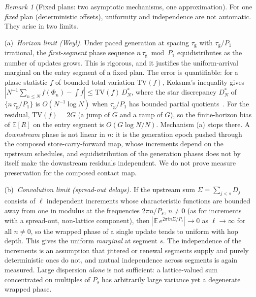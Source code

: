 \documentclass[twocolumn,3p,times,procedia]{elsarticle}
\theoremstyle{plain}
\theoremstyle{remark}
\newtheorem{remark}{Remark}
\newcommand{\E}{\mathbb{E}}
\newcommand{\GEN}{\tau_{\mathrm{g}}}
\begin{document}
\begin{remark}[Fixed plans: two asymptotic mechanisms, one
approximation]\label{rem:fixedmix}
For one \emph{fixed} plan (deterministic offsets), uniformity and
independence are not automatic. They arise in two limits.

(a)~\emph{Horizon limit (Weyl).} Under paced generation at spacing
$\GEN$ with $\GEN/P_1$ irrational, the \emph{first-segment} phase
sequence $n\,\GEN\bmod P_1$ equidistributes as the number of updates
grows. This is rigorous, and it justifies the uniform-arrival marginal
on the entry segment of a fixed plan. The error is quantifiable: for a
phase statistic $f$ of bounded total variation $\mathrm{TV}(f)$,
Koksma's inequality gives
$|N^{-1}\sum_{n\le N}f(\Phi_n)-\int f|\le \mathrm{TV}(f)\,D_N^{*}$, where
the star discrepancy $D_N^{*}$ of $\{n\,\GEN/P_1\}$ is
$O(N^{-1}\log N)$ when $\GEN/P_1$ has bounded partial
quotients~\cite{kuipers1974}. For the residual, $\mathrm{TV}(f)=2G$ (a
jump of $G$ and a ramp of $G$), so the finite-horizon bias of $\E[R]$
on the entry segment is $O(G\log N/N)$. Mechanism (a) stops there. A
\emph{downstream} phase is not linear in $n$: it is the generation
epoch pushed through the composed store-carry-forward map, whose
increments depend on the upstream schedules, and equidistribution of
the generation phases does not by itself make the downstream residuals
independent. We do not prove measure preservation for the composed
contact map.

(b)~\emph{Convolution limit (spread-out delays).} If the upstream sum
$\Sigma=\sum_{j<s}D_j$ consists of $\ell$ independent increments whose
characteristic functions are bounded away from one in modulus at the
frequencies $2\pi n/P_s$, $n\ne0$ (as for increments with a spread-out,
non-lattice component), then $|\E\,e^{2\pi i n\Sigma/P_s}|\to0$ as
$\ell\to\infty$ for all $n\ne0$, so the wrapped phase of a single update tends to uniform with
hop depth. This gives the uniform \emph{marginal} at segment $s$. The
independence of the increments is an assumption that jittered or
renewal segments supply and purely deterministic ones do not, and
mutual independence across segments is again measured. Large dispersion
\emph{alone} is not sufficient: a lattice-valued sum concentrated on
multiples of $P_s$ has arbitrarily large variance yet a degenerate
wrapped phase.


\end{remark}
\end{document}
